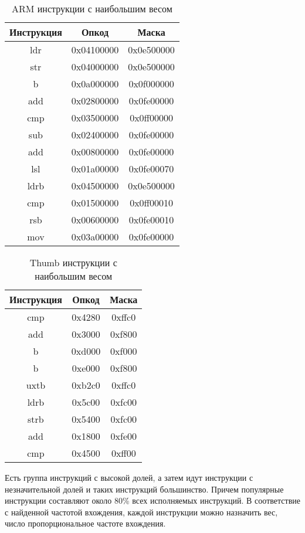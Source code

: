 \begin{table}[h!] \label{tab:arm_top}
	\caption{\label{tab:stat_arm_top} ARM инструкции с наибольшим весом}
	\begin{center}
		\begin{tabular} {|c|c|c|}
			\hline
			Инструкция & Опкод & Маска \\
			\hline
			ldr & 0x04100000 & 0x0e500000 \\
			\hline
			str & 0x04000000 & 0x0e500000 \\
			\hline
			b   & 0x0a000000 & 0x0f000000 \\
			\hline
			add & 0x02800000 & 0x0fe00000 \\
			\hline
			cmp & 0x03500000 & 0x0ff00000 \\
			\hline
			sub & 0x02400000 & 0x0fe00000 \\
			\hline
			add & 0x00800000 & 0x0fe00000 \\
			\hline
			lsl & 0x01a00000 & 0x0fe00070 \\
			\hline
			ldrb & 0x04500000 & 0x0e500000 \\
			\hline
			cmp & 0x01500000 & 0x0ff00010 \\
			\hline
			rsb & 0x00600000 & 0x0fe00010 \\
			\hline
			mov & 0x03a00000 & 0x0fe00000\\
			\hline
		\end{tabular}
	\end{center}
\end{table}

\begin{table}[h!]
	\caption{\label{tab:stat_thumb_top} Thumb инструкции с наибольшим весом}
	\begin{center}
		\begin{tabular} {|c|c|c|}
			\hline
			Инструкция & Опкод & Маска \\
			\hline
			cmp & 0x4280 & 0xffc0 \\
			\hline
			add & 0x3000 & 0xf800 \\
			\hline
			b   & 0xd000 & 0xf000 \\
			\hline
			b & 0xe000 & 0xf800 \\
			\hline
			uxtb & 0xb2c0 & 0xffc0 \\
			\hline
			ldrb & 0x5c00 & 0xfc00 \\
			\hline
			strb & 0x5400 & 0xfc00 \\
			\hline
			add & 0x1800 & 0xfe00 \\
			\hline
			cmp & 0x4500 & 0xff00 \\
			\hline
		\end{tabular}
	\end{center}
\end{table}

Есть группа инструкций с высокой долей, а затем идут инструкции с незначительной долей и таких инструкций большинство. Причем популярные инструкции составляют около 80\% всех исполняемых инструкций. В соответствие с найденной частотой вхождения, каждой инструкции можно назначить вес, число пропорциональное частоте вхождения.


